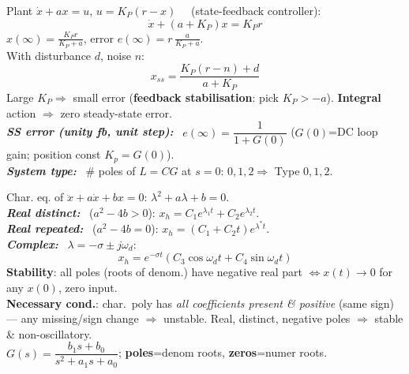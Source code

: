 \documentclass[9pt]{extarticle}
\newcommand{\sect}[1]{%
  \vspace{2pt}\par\noindent
  \colorbox{hdrbg}{\makebox[\dimexpr\linewidth-2\fboxsep][l]{%
    \textbf{\footnotesize\textcolor{hdr}{#1}}}}%
  \par\vspace{1.5pt}}
\newcommand{\sub}[1]{\textit{\textbf{#1:}}\ }
\begin{document}
\begin{multicols}{3}
\sect{4. Proportional / Steady-State Error}
Plant $\dot x+ax=u$, $u=K_P(r-x)\quad$  (state-feedback controller):
\[ \dot x+(a{+}K_P)x=K_Pr \]
$x(\infty)=\tfrac{K_Pr}{K_P+a}$, error $e(\infty)=r\,\tfrac{a}{K_P+a}$.\\
With disturbance $d$, noise $n$:
\[ x_{ss}=\frac{K_P(r-n)+d}{a+K_P} \]
Large $K_P\Rightarrow$ small error (\textbf{feedback stabilisation}: pick $K_P>-a$). \textbf{Integral} action $\Rightarrow$ zero steady-state error.\\
\sub{SS error (unity fb, unit step)} $e(\infty)=\dfrac{1}{1+G(0)}$ ($G(0)$=DC loop gain; position const $K_p{=}G(0)$).\\
\sub{System type} \# poles of $L{=}CG$ at $s{=}0$: $0,1,2\Rightarrow$ Type $0,1,2$.\par\noindent

\sect{5. Homogeneous Solns \& Poles (Lec 4)}
Char. eq. of $\ddot x+a\dot x+bx=0$: $\lambda^2+a\lambda+b=0$.\\
\sub{Real distinct} ($a^2{-}4b{>}0$): $x_h=C_1e^{\lambda_1 t}+C_2e^{\lambda_2 t}$.\\
\sub{Real repeated} ($a^2{-}4b{=}0$): $x_h=(C_1+C_2t)e^{\lambda^* t}$.\\
\sub{Complex} $\lambda=-\sigma\pm j\omega_d$:
\[ x_h=e^{-\sigma t}(C_3\cos\omega_d t+C_4\sin\omega_d t) \]
\textbf{Stability}: all poles (roots of denom.) have negative real part $\Leftrightarrow x(t)\!\to\!0$ for any $x(0)$, zero input.\\
\textbf{Necessary cond.}: char.\ poly has \emph{all coefficients present \& positive} (same sign) — any missing/sign change $\Rightarrow$ unstable. Real, distinct, negative poles $\Rightarrow$ stable \& non-oscillatory.\\
$G(s)=\dfrac{b_1s+b_0}{s^2+a_1s+a_0}$; \textbf{poles}=denom roots, \textbf{zeros}=numer roots.


\end{multicols}
\end{document}

